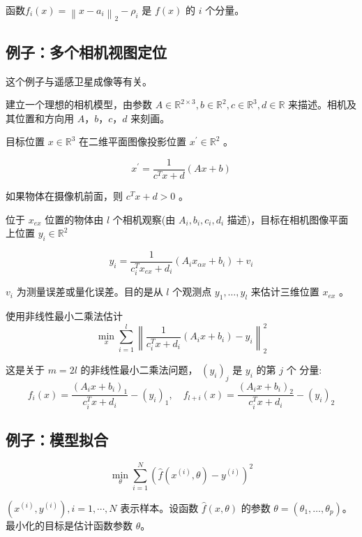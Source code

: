 函数$ f_{i}(x)=\left\|x-a_{i}\right\|_{2}-\rho_{i} $ 是 $ f(x) $ 的 $ i $ 个分量。


\subsection{例子：多个相机视图定位}

\begin{remark}
    这个例子与遥感卫星成像等有关。
\end{remark}

建立一个理想的相机模型，由参数 $ A \in \mathbb{R}^{2 \times 3}, b \in \mathbb{R}^{2}, c \in \mathbb{R}^{3}, d \in \mathbb{R} $ 来描述。相机及其位置和方向用 $ A ， b ， c ， d $ 来刻画。

目标位置 $ x \in \mathbb{R}^{3} $ 在二维平面图像投影位置 $ x^{\prime} \in \mathbb{R}^{2} $ 。

$$
x^{\prime}=\frac{1}{c^{T} x+d}(A x+b)
$$

如果物体在摄像机前面，则 $ c^{T} x+d>0 $ 。

\begin{problem}
    位于 $ x_{e x} $ 位置的物体由 $ l $ 个相机观察(由 $ A_{i}, b_{i}, c_{i}, d_{i} $ 描述)，目标在相机图像平面上位置 $ y_{i} \in \mathbb{R}^{2} $

    $$
    y_{i}=\frac{1}{c_{i}^{T} x_{e x}+d_{i}}\left(A_{i} x_{\alpha x}+b_{i}\right)+v_{i}
    $$

    $ v_{i} $ 为测量误差或量化误差。目的是从 $ l $ 个观测点 $ y_{1}, \ldots, y_{l} $ 来估计三维位置 $ x_{e x} $ 。
\end{problem}


使用非线性最小二乘法估计
$$
\min _{x} \sum_{i=1}^{l}\left\|\frac{1}{c_{i}^{T} x+d_{i}}\left(A_{i} x+b_{i}\right)-y_{i}\right\|_{2}^{2}
$$

这是关于 $ m=2 l $ 的非线性最小二乘法问题， $ \left(y_{i}\right)_{j} $ 是 $ y_{i} $ 的第 $ j $ 个 分量:
$$
f_{i}(x)=\frac{\left(A_{i} x+b_{i}\right)_{1}}{c_{i}^{T} x+d_{i}}-\left(y_{i}\right)_{1}, \quad f_{l+i}(x)=\frac{\left(A_{i} x+b_{i}\right)_{2}}{c_{i}^{T} x+d_{i}}-\left(y_{i}\right)_{2}
$$

\subsection{例子：模型拟合}

\begin{problem}
$$
\min _{\theta} \sum_{i=1}^{N}\left(\hat{f}\left(x^{(i)}, \theta\right)-y^{(i)}\right)^{2}
$$

$ \left(x^{(i)}, y^{(i)}\right), i=1, \cdots, N $ 表示样本。设函数 $ \hat{f}(x, \theta) $ 的参数 $ \theta = \left(\theta_{1}, \ldots, \theta_{p}\right) $。最小化的目标是估计函数参数 $ \theta $。
\end{problem}

